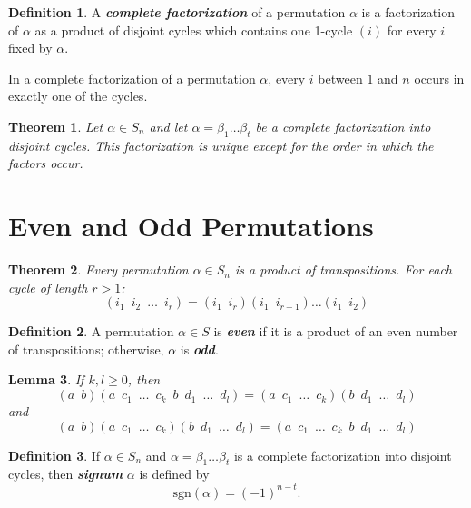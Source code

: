 \documentclass[10pt]{report}
\newtheorem{theorem}{Theorem}[chapter]
\newtheorem{lemma}[theorem]{Lemma}
\theoremstyle{definition}
\newtheorem*{definition}{Definition}
\newcommand{\term}[1]{\textbf{\textit{#1}}}
\begin{document}
\begin{definition}
	A \term{complete factorization} of a permutation $\alpha$ is a factorization of $\alpha$ as a product of disjoint cycles which contains one 1-cycle $(i)$ for every $i$ fixed by $\alpha$.
	\smallskip

	In a complete factorization of a permutation $\alpha$, every $i$ between $1$ and $n$ occurs in exactly one of the cycles.
\end{definition}

\begin{theorem}
	Let $\alpha\in S_n$ and let $\alpha=\beta_1\dots\beta_t$ be a complete factorization into disjoint cycles. This factorization is unique except for the order in which the factors occur.
\end{theorem}

\section{Even and Odd Permutations}
\begin{theorem}
	Every permutation $\alpha\in S_n$ is a product of transpositions. For each cycle of length $r>1$:
	\[ (i_1\enspace i_2\enspace\dots\enspace i_r)=(i_1\enspace i_r)(i_1\enspace i_{r-1})\dots(i_1\enspace i_2)\]
\end{theorem}

\begin{definition}
	A permutation $\alpha\in S$ is \term{even} if it is a product of an even number of transpositions; otherwise, $\alpha$ is \term{odd}.
\end{definition}

\begin{lemma}
	If $k, l\geq0$, then
	\[ (a\enspace b)(a\enspace c_1\enspace\dots\enspace c_k\enspace b\enspace d_1\enspace\dots\enspace d_l) = (a\enspace c_1\enspace\dots\enspace c_k)(b\enspace d_1\enspace\dots\enspace d_l) \]
	and
	\[ (a\enspace b)(a\enspace c_1\enspace\dots\enspace c_k)(b\enspace d_1\enspace\dots\enspace d_l) = (a\enspace c_1\enspace\dots\enspace c_k\enspace b\enspace d_1\enspace\dots\enspace d_l) \]
\end{lemma}

\begin{definition}
	If $\alpha\in S_n$ and $\alpha=\beta_1\dots\beta_t$ is a complete factorization into disjoint cycles, then \term{signum} $\alpha$ is defined by
	\[ \text{sgn}(\alpha) = (-1)^{n-t}. \]
\end{definition}
\end{document}

